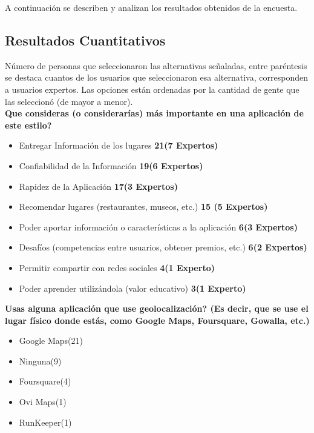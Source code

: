 \documentclass[10pt,letterpaper]{article}
\begin{document}
A continuación se describen y analizan los resultados obtenidos de la encuesta.\\

\subsection{Resultados Cuantitativos}

Número de personas que seleccionaron las alternativas señaladas, entre paréntesis se destaca cuantos de los usuarios que seleccionaron esa alternativa, corresponden a usuarios expertos. Las opciones están ordenadas por la cantidad de gente que las seleccionó (de mayor a menor).\\

\textbf{Que consideras (o considerarías) más importante en una aplicación de este estilo?}\\

\begin{itemize}
\item Entregar Información de los lugares \textbf{21(7 Expertos)}
\item Confiabilidad de la Información \textbf{19(6 Expertos)}
\item Rapidez de la Aplicación \textbf{17(3 Expertos)}
\item Recomendar lugares (restaurantes, museos, etc.) \textbf{15 (5 Expertos)}
\item Poder aportar información o características a la aplicación \textbf{6(3 Expertos)}
\item Desafíos (competencias entre usuarios, obtener premios, etc.) \textbf{6(2 Expertos)}
\item Permitir compartir con redes sociales \textbf{4(1 Experto)}
\item Poder aprender utilizándola (valor educativo) \textbf{3(1 Experto)}
\end{itemize}

\textbf{Usas alguna aplicación que use geolocalización? (Es decir, que se use el lugar físico donde estás, como Google Maps, Foursquare, Gowalla, etc.)}

\begin{itemize}
\item Google Maps(21)
\item Ninguna(9)
\item Foursquare(4)
\item Ovi Maps(1)
\item RunKeeper(1)
\end{itemize}
\end{document}
